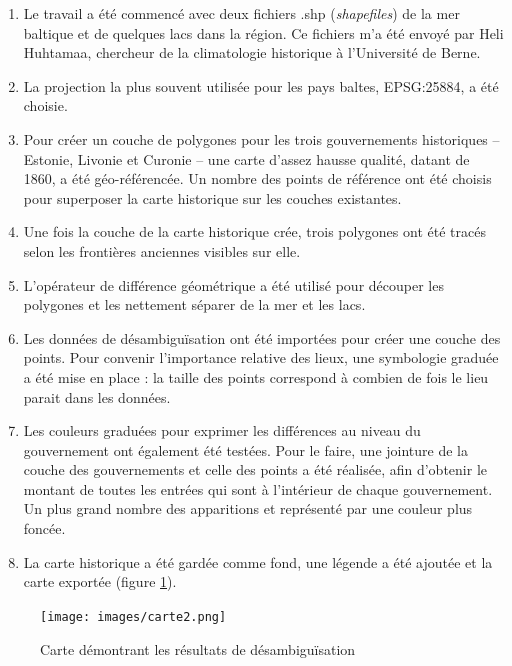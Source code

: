 \documentclass[a4paper,twoside,12pt]{article}
\begin{document}
\begin{enumerate}
    \item Le travail a été commencé avec deux fichiers .shp (\textit{shapefiles}) de la mer baltique et de quelques lacs dans la région.  Ce fichiers m’a été envoyé par Heli Huhtamaa, chercheur de la climatologie historique à l'Université de Berne.
    \item La projection la plus souvent utilisée pour les pays baltes, EPSG:25884, a été choisie.
    \item Pour créer un couche de polygones pour les trois gouvernements historiques – Estonie, Livonie et Curonie – une carte d'assez hausse qualité, datant de 1860, a été géo-référencée. Un nombre des points de référence ont été choisis pour superposer la carte historique sur les couches existantes.
    \item Une fois la couche de la carte historique crée, trois polygones ont été tracés selon les frontières anciennes visibles sur elle.
    \item L'opérateur de différence géométrique a été utilisé pour découper les polygones et les nettement séparer de la mer et les lacs.
    \item Les données de désambiguïsation ont été importées pour créer une couche des points. Pour convenir l’importance relative des lieux, une symbologie graduée a été mise en place : la taille des points correspond à combien de fois le lieu parait dans les données.
    \item Les couleurs graduées pour exprimer les différences au niveau du gouvernement ont également été testées. Pour le faire, une jointure de la couche des gouvernements et celle des points a été réalisée, afin d’obtenir le montant de toutes les entrées qui sont à l’intérieur de chaque gouvernement. Un plus grand nombre des apparitions et représenté par une couleur plus foncée.
	\item La carte historique a été gardée comme fond, une légende a été ajoutée et la carte exportée (figure \ref{fig:carte_finale}).
\end{enumerate}
\vspace{1ex}

\begin{figure}[h]
    \centering
    \texttt{[image: images/carte2.png]}
    \caption{Carte démontrant les résultats de désambiguïsation}
    \label{fig:carte_finale}
\end{figure}
\end{document}
